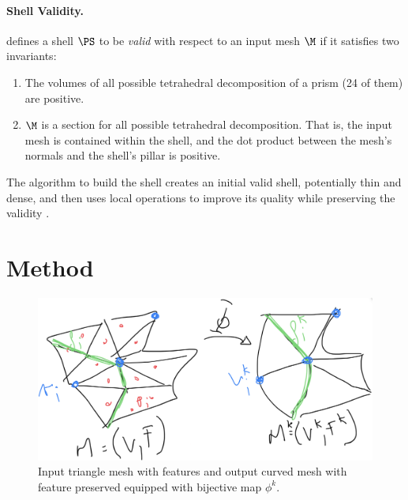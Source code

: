 \paragraph{Shell Validity.}
\cite{jiang2020bijective} defines a shell $\PS$ to be \emph{valid} with respect to an input mesh $\M$ if it satisfies two invariants:
\begin{enumerate}
    \item The volumes of all possible tetrahedral decomposition of a prism (24 of them) are positive.
    \item $\M$ is a section for all possible tetrahedral decomposition. That is, the input mesh is contained within the shell, and the dot product between the mesh's normals and the shell's pillar is positive. 
\end{enumerate}


The algorithm to build the shell creates an initial valid shell, potentially thin and dense, and then uses local operations to improve its quality while preserving the validity \cite{jiang2020bijective}.


\section{Method}

\begin{figure}
    \centering
    \includegraphics[width=\linewidth]{curve_meshing_in_shell_tex/figs/input-output}
    \caption{Input triangle mesh with features and output curved mesh with feature preserved equipped with bijective map $\phi^k$.}
    \label{bichon:fig:input-output}
\end{figure}

